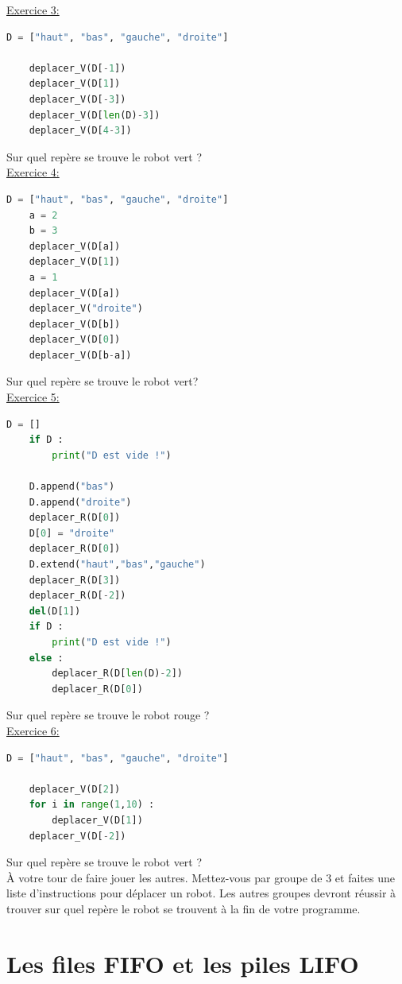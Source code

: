 \documentclass{report}
\begin{document}
\newpage
\underline{Exercice 3:}
\begin{lstlisting}[language=Python]
    D = ["haut", "bas", "gauche", "droite"]

    deplacer_V(D[-1])
    deplacer_V(D[1])
    deplacer_V(D[-3])
    deplacer_V(D[len(D)-3])
    deplacer_V(D[4-3])
\end{lstlisting}
Sur quel repère se trouve le robot vert ?\\

\underline{Exercice 4:}
\begin{lstlisting}[language=Python]
    D = ["haut", "bas", "gauche", "droite"]
    a = 2
    b = 3
    deplacer_V(D[a])
    deplacer_V(D[1])
    a = 1
    deplacer_V(D[a])
    deplacer_V("droite")
    deplacer_V(D[b])
    deplacer_V(D[0])
    deplacer_V(D[b-a])
\end{lstlisting}
Sur quel repère se trouve le robot vert?\\

\underline{Exercice 5:}
\begin{lstlisting}[language=Python]
    D = []
    if D :
        print("D est vide !")

    D.append("bas")
    D.append("droite")
    deplacer_R(D[0])
    D[0] = "droite"
    deplacer_R(D[0])
    D.extend("haut","bas","gauche")
    deplacer_R(D[3])
    deplacer_R(D[-2])
    del(D[1])
    if D :
        print("D est vide !")
    else :
        deplacer_R(D[len(D)-2])
        deplacer_R(D[0])
\end{lstlisting}
Sur quel repère se trouve le robot rouge ?\\

\underline{Exercice 6:}
\begin{lstlisting}[language=Python]
    D = ["haut", "bas", "gauche", "droite"]

    deplacer_V(D[2])
    for i in range(1,10) :
        deplacer_V(D[1])
    deplacer_V(D[-2])
\end{lstlisting}
Sur quel repère se trouve le robot vert ?\\

À votre tour de faire jouer les autres. Mettez-vous par groupe de 3 et faites une liste d'instructions pour déplacer un robot. Les autres groupes devront réussir à trouver sur quel repère le robot se trouvent à la fin de votre programme.


\newpage
\section{Les files FIFO et les piles LIFO}
\end{document}
